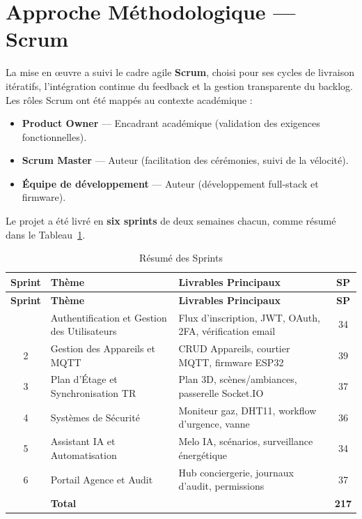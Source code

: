 \section{Approche Méthodologique --- Scrum}

La mise en œuvre a suivi le cadre agile \textbf{Scrum}, choisi pour ses cycles de livraison
itératifs, l'intégration continue du feedback et la gestion transparente du backlog.
Les rôles Scrum ont été mappés au contexte académique :

\begin{itemize}[leftmargin=1.5cm,itemsep=6pt]
  \item \textbf{Product Owner} --- Encadrant académique (validation des exigences fonctionnelles).
  \item \textbf{Scrum Master} --- Auteur (facilitation des cérémonies, suivi de la vélocité).
  \item \textbf{Équipe de développement} --- Auteur (développement full-stack et firmware).
\end{itemize}

\noindent Le projet a été livré en \textbf{six sprints} de deux semaines chacun, comme
résumé dans le Tableau~\ref{tab:sprint_resume}.

\begin{center}
\begin{longtable}{c p{} p{} c}
\caption{Résumé des Sprints}\label{tab:sprint_resume}\\
\toprule
\textbf{Sprint} & \textbf{Thème} & \textbf{Livrables Principaux} & \textbf{SP} \\
\midrule
\endfirsthead
\toprule
\textbf{Sprint} & \textbf{Thème} & \textbf{Livrables Principaux} & \textbf{SP} \\
\midrule
\endhead
\bottomrule
\endfoot
1 & Authentification et Gestion des Utilisateurs & Flux d'inscription, JWT, OAuth, 2FA, vérification email & 34 \\
2 & Gestion des Appareils et MQTT              & CRUD Appareils, courtier MQTT, firmware ESP32           & 39 \\
3 & Plan d'Étage et Synchronisation TR         & Plan 3D, scènes/ambiances, passerelle Socket.IO         & 37 \\
4 & Systèmes de Sécurité                       & Moniteur gaz, DHT11, workflow d'urgence, vanne          & 36 \\
5 & Assistant IA et Automatisation             & Melo IA, scénarios, surveillance énergétique            & 34 \\
6 & Portail Agence et Audit                    & Hub conciergerie, journaux d'audit, permissions         & 37 \\
\midrule
  & \textbf{Total}                             &                                                          & \textbf{217} \\
\bottomrule
\end{longtable}
\end{center}


